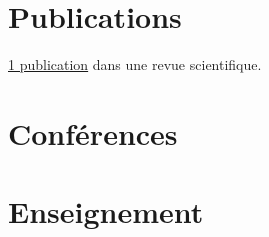 \documentclass[a4paper,extended,fr]{adcv}
\begin{document}
    \section{Publications}

    \ifextended

        \begin{refsection}
            \nocite{Benshila_Etal_2020}
            \printbibliography[title={Revues scientifiques}, heading=subbibliography]
        \end{refsection}



    \else
        \href{https://scholar.google.com/citations?user=tqxQbU0AAAAJ}{1 publication} dans une revue scientifique.
    \fi

    \ifextended
        \section{Conf{\'{e}}rences}

        \begin{adcvpresentations}
        \end{adcvpresentations}
    \fi

    \ifextended
        \section{Enseignement}
\end{document}

